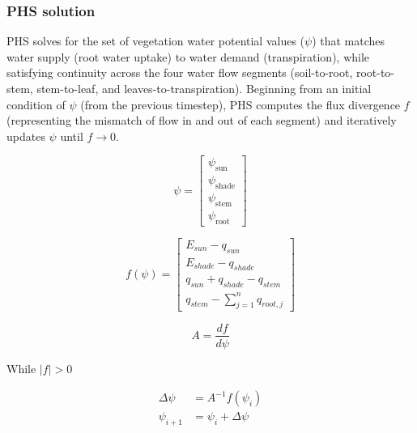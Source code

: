 \documentclass[draft,linenumbers]{agujournal}
\begin{document}
     
    \subsubsection{PHS solution}
    \label{sect:solution}
    
    PHS solves for the set of vegetation water potential values ($\psi$) that matches water supply (root water uptake) to water demand (transpiration), while satisfying continuity across the four water flow segments (soil-to-root, root-to-stem, stem-to-leaf, and leaves-to-transpiration). 
    Beginning from an initial condition of $\psi$ (from the previous timestep), PHS computes the flux divergence $f$ (representing the mismatch of flow in and out of each segment) and iteratively updates $\psi$ until $f\to0$.
    
    \begin{linenomath*}
    \begin{equation} 
    \psi = \left[
    \begin{array}{c}
    \psi_{\text{sun}} \\ 
    \psi_{\text{shade}} \\ 
    \psi_{\text{stem}} \\ 
    \psi_{\text{root}}            
    \end{array} \right]
    \end{equation}
    \end{linenomath*}
    
    \begin{linenomath*}
    \begin{equation}
    f\left(\psi\right) = \left[ 
    \begin{array}{c}
    E_{sun}-q_{sun}\\
    E_{shade}-q_{shade}\\
    q_{sun}+q_{shade}-q_{stem}\\
    q_{stem}-\sum_{j=1}^n{q_{root,j}}
    \end{array} \right]
    \end{equation}
    \end{linenomath*}
    
    \begin{linenomath*}
    \begin{equation}
    A = \dfrac{df}{d\psi}
    \end{equation}
    \end{linenomath*}    
    
    While $\left|f\right|>0$
    \begin{linenomath*}
    \begin{equation} \begin{aligned}
    \label{eq:iter}
    \Delta\psi &=A^{-1}f\left(\psi_i\right) \\
    \psi_{i+1}  &= \psi_i + \Delta\psi
    \end{aligned} \end{equation}
    \end{linenomath*}    
    
\end{document}
